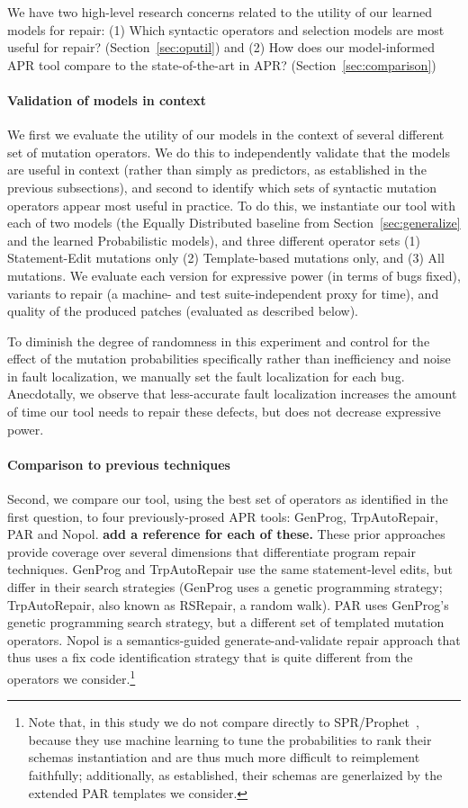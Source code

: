 \documentclass[conference]{IEEEtran}
\newcommand{\todo}[1]
  {{\scriptsize \textbf{\color{red} {#1}}}}
\begin{document}
We have two high-level research concerns related to the utility of our
learned models for repair: 
(1) Which syntactic operators and selection models are most
  useful for repair? (Section~\ref{sec:oputil}) and (2)
How does our model-informed APR tool compare to the
    state-of-the-art in APR? (Section~\ref{sec:comparison})

\paragraph{Validation of models in context} We first we evaluate the utility of our models in the
context of several different set of mutation operators.  We do this to
independently validate that the models are useful in context (rather than simply
as predictors, as established in the previous subsections), and second to
identify which sets of syntactic mutation operators appear most useful in
practice.  To do this, we
instantiate our tool with each of 
two models (the Equally Distributed baseline from Section~\ref{sec:generalize}
and the learned Probabilistic models), and three different operator sets (1) Statement-Edit mutations only (2)
Template-based mutations only, and (3) All mutations. We evaluate each version
for expressive power (in terms of bugs fixed), variants to repair (a machine-
and test suite-independent proxy for time), and quality of the produced patches
(evaluated as described below). 

To diminish the degree of randomness in this experiment and control for the
effect of the mutation probabilities specifically rather than inefficiency and
noise in fault localization, we manually set the fault localization for each
bug. Anecdotally, we observe that less-accurate fault localization increases the
amount of time our tool needs to repair these defects, but does not decrease expressive
power.  

\paragraph{Comparison to previous techniques} Second, we compare our tool, using
the best set of operators as identified in the first question, to four
previously-prosed APR tools: GenProg, TrpAutoRepair, PAR and Nopol.\todo{add a
  reference for each of these.} These prior approaches provide coverage over
several dimensions that differentiate program repair techniques.  GenProg and
TrpAutoRepair use the same statement-level edits, but differ in their search
strategies (GenProg uses a genetic programming strategy; TrpAutoRepair, also
known as RSRepair, a random walk). PAR uses GenProg's genetic programming search
strategy, but a different set of templated mutation operators.  Nopol is a
semantics-guided generate-and-validate repair approach that thus uses a fix code
identification strategy that is quite different from the operators we
consider.\footnote{Note that, in this study we do not compare directly to
  SPR/Prophet~\cite{long16proph}, because they use machine learning to tune the
  probabilities to rank their schemas instantiation and are thus much more
  difficult to reimplement faithfully; additionally, as established, their
  schemas are generlaized by the extended PAR templates we consider.}
\end{document}
